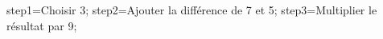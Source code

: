 \documentclass[exercice]{thedocument}%
\begin{document}
%
    \>step1=Choisir 3;%
    \>step2=Ajouter la différence de 7 et 5;%
    \>step3=Multiplier le résultat par 9;%
\end{document}
